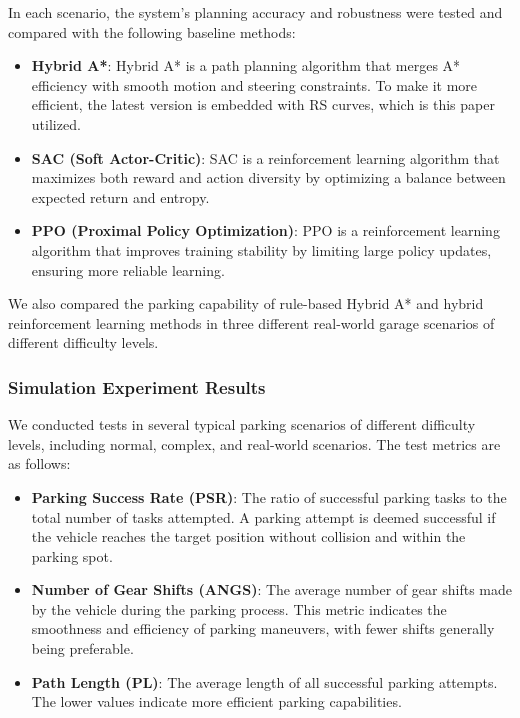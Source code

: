 \documentclass[ conference]{./support/ieeeconf}
\begin{document}
In each scenario, the system’s planning accuracy and robustness were tested and compared with the following baseline methods:
\begin{itemize}
    \item \textbf{Hybrid A*}: Hybrid A*\cite{hybridAstar} is a path planning algorithm that merges A* efficiency with smooth motion and steering constraints. To make it more efficient, the latest version is embedded with RS curves, which is this paper utilized.
    \item \textbf{SAC (Soft Actor-Critic)}: SAC \cite{SAC2018} is a reinforcement learning algorithm that maximizes both reward and action diversity by optimizing a balance between expected return and entropy.
    \item \textbf{PPO (Proximal Policy Optimization)}: PPO\cite{PPO2017} is a reinforcement learning algorithm that improves training stability by limiting large policy updates, ensuring more reliable learning.
\end{itemize}


We also compared the parking capability of rule-based Hybrid A* and hybrid reinforcement learning methods in three different real-world garage scenarios of different difficulty levels. 

\subsubsection{Simulation Experiment Results}
    We conducted tests in several typical parking scenarios of different difficulty levels, including normal, complex, and real-world scenarios. The test metrics are as follows:
\begin{itemize}
    \item \textbf{Parking Success Rate (PSR)}: The ratio of successful parking tasks to the total number of tasks attempted. 
    A parking attempt is deemed successful if the vehicle reaches the target position without collision and within the parking spot.
    \item \textbf{Number of Gear Shifts (ANGS)}: The average number of gear shifts made by the vehicle during the parking process. 
    This metric indicates the smoothness and efficiency of parking maneuvers, with fewer shifts generally being preferable.
    \item \textbf{Path Length (PL)}: The average length of all successful parking attempts. 
    The lower values indicate more efficient parking capabilities.
\end{itemize}
\end{document}

